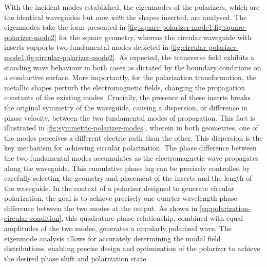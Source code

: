 \documentclass[11pt,a4paper,twoside,openany]{report}
\begin{document}
With the incident modes established, the eigenmodes of the polarizers, which are the identical waveguides but now \emph{with} the shapes inserted, are analysed. The eigenmodes take the form presented in \cref{fig:square-polarizer-mode1,fig:square-polarizer-mode2} for the square geometry, whereas the circular waveguide with inserts supports two fundamental modes depicted in \cref{fig:circular-polarizer-mode1,fig:circular-polarizer-mode2}. As expected, the transverse field exhibits a standing wave behaviour in both cases as dictated by the boundary conditions on a conductive surface. More importantly, for the polarization transformation, the metallic shapes perturb the electromagnetic fields, changing the propagation constants of the existing modes. Crucially, the presence of these inserts breaks the original symmetry of the waveguide, causing a dispersion, or difference in phase velocity, between the two fundamental modes of propagation. This fact is illustrated in \cref{fig:symmetric-polarizer-modes}, wherein in both geometries, one of the modes perceives a different electric path than the other. This dispersion is the key mechanism for achieving circular polarization. The phase difference between the two fundamental modes accumulates as the electromagnetic wave propagates along the waveguide. This cumulative phase lag can be precisely controlled by carefully selecting the geometry and placement of the inserts and the length of the waveguide. In the context of a polarizer designed to generate circular polarization, the goal is to achieve precisely one-quarter wavelength phase difference between the two modes at the output. As shown in \cref{eq:polarization-circular-condition}, this quadrature phase relationship, combined with equal amplitudes of the two modes, generates a circularly polarized wave. The eigenmode analysis allows for accurately determining the modal field distributions, enabling precise design and optimization of the polarizer to achieve the desired phase shift and polarization state.
\end{document}
